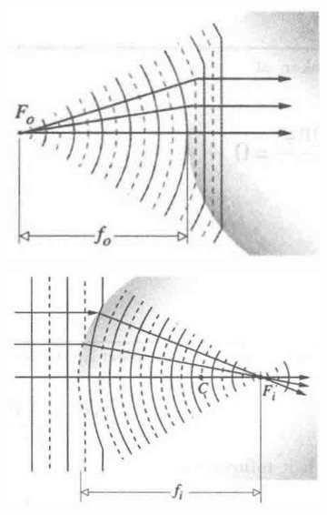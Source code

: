 \begin{figure}[H]
  \centering
  \begin{subfigure}{.3\textwidth}
    \centering
    \includegraphics[width=\linewidth]{figures/Refraction-at-a-Spherical-Interface-1.jpg}
    \label{fig:}
  \end{subfigure}
  \hspace{2cm}
  \begin{subfigure}{.4\textwidth}
    \centering
    \includegraphics[width=\linewidth]{figures/Refraction-at-a-Spherical-Interface-2.jpg}
    \label{fig:}
  \end{subfigure}
  \label{fig:}
\end{figure}


